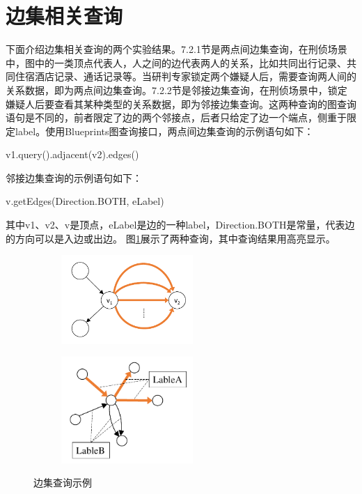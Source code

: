 \section{边集相关查询}
下面介绍边集相关查询的两个实验结果。7.2.1节是两点间边集查询，在刑侦场景中，图中的一类顶点代表人，人之间的边代表两人的关系，比如共同出行记录、共同住宿酒店记录、通话记录等。当研判专家锁定两个嫌疑人后，需要查询两人间的关系数据，即为两点间边集查询。7.2.2节是邻接边集查询，在刑侦场景中，锁定嫌疑人后要查看其某种类型的关系数据，即为邻接边集查询。这两种查询的图查询语句是不同的，前者限定了边的两个邻接点，后者只给定了边一个端点，侧重于限定label。使用Blueprints图查询接口，两点间边集查询的示例语句如下：
\begin{center}
  v1.query().adjacent(v2).edges()
\end{center}
邻接边集查询的示例语句如下：
\begin{center}
  v.getEdges(Direction.BOTH, eLabel)
\end{center}
其中v1、v2、v是顶点，eLabel是边的一种label，Direction.BOTH是常量，代表边的方向可以是入边或出边。
图\ref{fig:edge_queries}展示了两种查询，其中查询结果用高亮显示。

\begin{figure}
\centering
\begin{subfigure}[b]{.3\linewidth}
\centering
\includegraphics[width=50mm]{fig/2v_edge_query.pdf}
\end{subfigure}
\qquad
\begin{subfigure}[b]{.3\linewidth}
\centering
\includegraphics[width=50mm]{fig/get_edges_query.pdf}
\end{subfigure}
\caption{边集查询示例}
\label{fig:edge_queries}
\end{figure}


